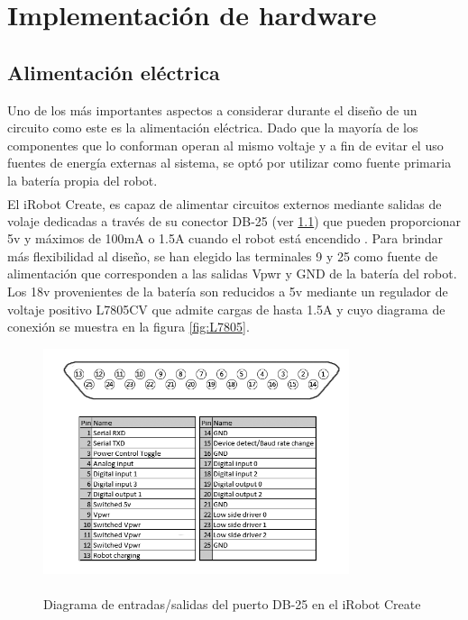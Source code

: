 \documentclass[letterpaper,openright,12pt]{book}
\begin{document}
\chapter{Implementación de hardware}
\section{Alimentación eléctrica}
Uno de los más importantes aspectos a considerar durante el diseño de un circuito como este es la alimentación eléctrica. Dado que la mayoría de los componentes que lo conforman operan al mismo voltaje y a fin de evitar el uso fuentes de energía externas al sistema, se optó por utilizar como fuente primaria la batería propia del robot.\\
El iRobot Create\textsuperscript{\textsuperscript{\textregistered}}, es capaz de alimentar circuitos externos mediante salidas de volaje dedicadas a través de su conector DB-25 (ver \ref{fig:createPinout}) que pueden proporcionar 5v y máximos de 100mA o 1.5A cuando el robot está encendido \cite{irobotm}. Para brindar más flexibilidad al diseño, se han elegido las terminales 9 y 25 como fuente de alimentación que corresponden a las salidas Vpwr y GND de la batería del robot. Los 18v provenientes de la batería son reducidos a 5v mediante un regulador de voltaje positivo L7805CV que admite cargas de hasta 1.5A y cuyo diagrama de conexión se muestra en la figura \ref{fig:L7805}.

\begin{figure}
\begin{center}
\includegraphics[width=0.8\textwidth]{figures/createPinout.png}
\caption{Diagrama de entradas/salidas del puerto DB-25 en el iRobot Create\textsuperscript{\textsuperscript{\textregistered}}}
\centering
\label{fig:createPinout}
\end{center}
\end{figure} 
\end{document}
